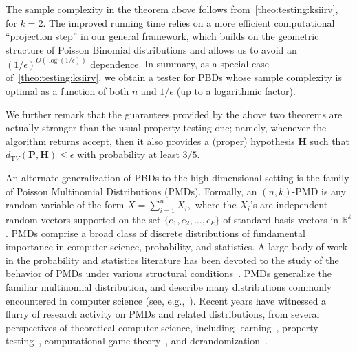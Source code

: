 \documentclass[11pt]{article}
\newcommand{\new}[1]{{\color{red} #1}}
\newcommand{\new}[1]{{#1}}
\theoremstyle{definition}
\newcommand{\R}{\mathbb{R}}
\newcommand{\p}{\mathbf{P}}
\newcommand{\h}{\mathbf{H}}
\newcommand{\dtv}{d_{\mathrm TV}}
\newcommand{\eps}{\epsilon}
\newcommand{\accept}{\textsf{accept}\xspace}
\newcommand{\bigO}[1]{{O\left( #1 \right)}}
\begin{document}
The sample complexity in the theorem above follows from~\cref{theo:testing:ksiirv}, for $k=2$. 
The improved running time relies on a more efficient computational ``projection step''  in our general framework,
which builds on the geometric structure of Poisson Binomial distributions \new{and allows us to avoid an $(1/\eps)^{\bigO{\log(1/\eps)}}$ dependence}. 
In summary, as a special case of~\cref{theo:testing:ksiirv}, we obtain a tester for PBDs 
whose sample complexity is optimal as a function of both $n$ and $1/\eps$ (up to a logarithmic factor).

We further remark that the guarantees provided by the above two theorems 
are actually stronger than the usual property testing one; namely, whenever the algorithm returns \accept, 
then it also provides a (proper) hypothesis $\h$ such that $\dtv(\p,\h)\leq \eps$ with probability at least $3/5$.


An alternate generalization of PBDs to the high-dimensional setting is the family of
Poisson Multinomial Distributions (PMDs).
Formally, an $(n, k)$-PMD is any random variable of the form $X = \sum_{i=1}^n X_i,$
where the $X_i$'s are independent random vectors supported on the set
$\{e_1, e_2, \ldots, e_k \}$ of standard basis vectors in $\R^k$.
PMDs comprise a broad class of discrete distributions of fundamental importance in computer science, probability, and statistics.
A large body of work in the probability and statistics literature has been devoted to the study of the behavior
of PMDs under various structural conditions~\cite{Barbour88, Loh92, BHJ:92, Bentkus:03, Roos99, Roos10}.
PMDs generalize the familiar multinomial distribution, and describe many distributions
commonly encountered in computer science (see, e.g.,~\cite{DaskalakisP07, DaskalakisP08, Valiant08stoc, ValiantValiant:11}).
Recent years have witnessed a flurry of research activity on PMDs and related distributions,
from several perspectives of theoretical computer science,
including learning~\cite{DDS12stoc, DDOST13focs, DKS:16, DKT15, DKS15b},
property testing~\cite{Valiant08stoc, VV10b, ValiantValiant:11},
 computational game theory~\cite{DaskalakisP07, DaskalakisP08, BorgsCIKMP08, DaskalakisP09, DaskalakisP2014, GT14,CDS:17},
 and derandomization~\cite{GMRZ11, BDS12, De15, GKM15}. 
\end{document}
